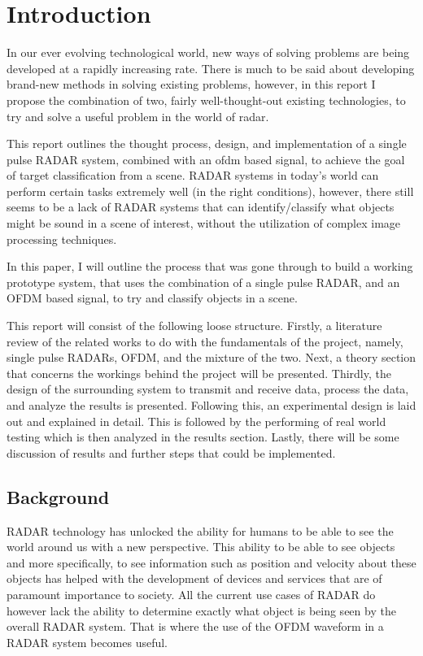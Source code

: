 \documentclass[class=report,11pt,crop=false]{standalone}
\begin{document}
\chapter{Introduction}\label{ch:Introduction}
In our ever evolving technological world, new ways of solving problems are being developed at a rapidly increasing rate. There is much to be said about developing brand-new methods in solving existing problems, however, in this report I propose the combination of two, fairly well-thought-out existing technologies, to try and solve a useful problem in the world of \gls{radar}. 

This report outlines the thought process, design, and implementation of a single pulse RADAR system, combined with an \gls{ofdm} based signal, to achieve the goal of target classification from a scene. RADAR systems in today's world can perform certain tasks extremely well (in the right conditions), however, there still seems to be a lack of RADAR systems that can identify/classify what objects might be sound in a scene of interest, without the utilization of complex image processing techniques. 

In this paper, I will outline the process that was gone through to build a working prototype system, that uses the combination of a single pulse RADAR, and an OFDM based signal, to try and classify objects in a scene.

This report will consist of the following loose structure. Firstly, a literature review of the related works to do with the fundamentals of the project, namely, single pulse RADARs, OFDM, and the mixture of the two. Next, a theory section that concerns the workings behind the project will be presented. Thirdly, the design of the surrounding system to transmit and receive data, process the data, and analyze the results is presented. Following this, an experimental design is laid out and explained in detail. This is followed by the performing of real world testing which is then analyzed in the results section. Lastly, there will be some discussion of results and further steps that could be implemented.


\section{Background}
RADAR technology has unlocked the ability for humans to be able to see the world around us with a new perspective. This ability to be able to see objects and more specifically, to see information such as position and velocity about 
these objects has helped with the development of devices and services that are of paramount importance to society. All the current use cases of RADAR do however lack the ability to determine exactly what object is being seen by the overall RADAR system. That is where the use of the OFDM waveform in a RADAR system becomes useful.
\end{document}
